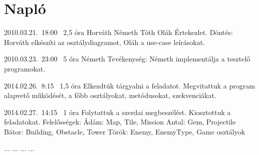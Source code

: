 %
\section{Napló}

\begin{naplo}

\bejegyzes
{2010.03.21.~18:00~} %
{2,5 óra} %
{Horváth\newline
Németh\newline
Tóth\newline
Oláh} %
{Értekezlet. Döntés: Horváth elkészíti az osztálydiagramot, Oláh a use-case leírásokat.} %

\bejegyzes
{2010.03.23.~23:00~}
{5 óra}
{Németh}
{Tevékenység: Németh implementálja a tesztelő programokat.}

\bejegyzes
{2014.02.26.~8:15~} %
{1,5 óra} %
{\vadam\newline
\vantal\newline
\vbator\newline
\vtorok}
{Elkezdtük tárgyalni a feladatot. Megvitattuk a program alapvető működését, a főbb osztályokat, metódusokat, szekvenciákat.}

\bejegyzes
{2014.02.27.~14:15~}
{1 óra}
{\vadam\newline
\vantal\newline
\vbator\newline
\vtorok}
{Folytattuk a szerdai megbeszélést. Kiosztottuk a feladatokat. \newline Felelősségek: \newline
Ádám: Map, Tile, Mission \newline
Antal: Gem, Projectile \newline
Bátor: Building, Obstacle, Tower \newline
Török: Enemy, EnemyType, Game \newline osztályok }

\bejegyzes
{...}
{...}
{...}
{...}


\end{naplo}

